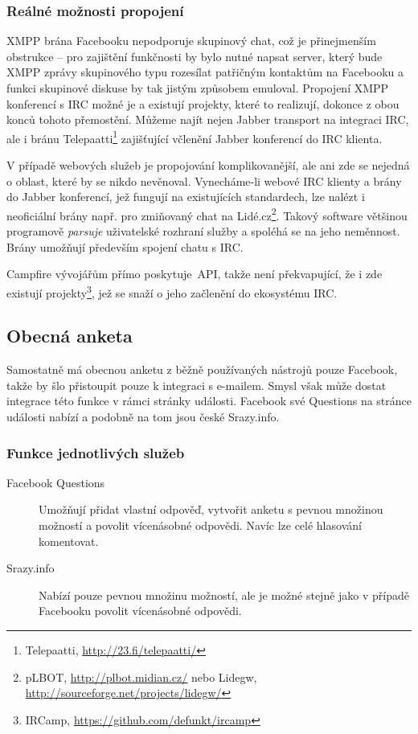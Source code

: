 \documentclass[12pt,oneside,final]{fithesis2}
\begin{document}
\subsubsection*{Reálné možnosti propojení}
XMPP brána Facebooku nepodporuje skupinový chat, což je přinejmenším obstrukce -- pro zajištění funkčnosti by bylo nutné napsat server, který bude XMPP zprávy skupinového typu rozesílat patřičným kontaktům na Facebooku a funkci skupinové diskuse by tak jistým způsobem emuloval. Propojení XMPP konferencí s IRC možné je a existují projekty, které to realizují, dokonce z obou konců tohoto přemostění. Můžeme najít nejen Jabber transport na integraci IRC, ale i bránu Telepaatti\footnote{Telepaatti, \url{http://23.fi/telepaatti/}} zajišťující včlenění Jabber konferencí do IRC klienta.

V případě webových služeb je propojování komplikovanější, ale ani zde se nejedná o oblast, které by se nikdo nevěnoval. Vynecháme-li webové IRC klienty a brány do Jabber konferencí, jež fungují na existujících standardech, lze nalézt i neoficiální brány např. pro zmiňovaný chat na Lidé.cz\footnote{pLBOT, \url{http://plbot.midian.cz/} nebo Lidegw, \url{http://sourceforge.net/projects/lidegw/}}. Takový software většinou programově \emph{parsuje} uživatelské rozhraní služby a spoléhá se na jeho neměnnost. Brány umožňují především spojení chatu s IRC.

Campfire vývojářům přímo poskytuje~API, takže není překvapující, že i zde existují projekty\footnote{IRCamp, \url{https://github.com/defunkt/ircamp}}, jež se snaží o jeho začlenění do ekosystému IRC.

\subsection{Obecná anketa}\label{genericPoll}
Samostatně má obecnou anketu z běžně používaných nástrojů pouze Facebook, takže by šlo přistoupit pouze k integraci s e-mailem. Smysl však může dostat integrace této funkce v rámci stránky události. Facebook své Questions na stránce události nabízí a podobně na tom jsou české Srazy.info.

\subsubsection*{Funkce jednotlivých služeb}
\begin{description}
    \item[Facebook Questions]
        Umožňují přidat vlastní odpověď, vytvořit anketu s pevnou množinou možností a povolit vícenásobné odpovědi. Navíc lze celé hlasování komentovat.

    \item[Srazy.info]
        Nabízí pouze pevnou množinu možností, ale je možné stejně jako v případě Facebooku povolit vícenásobné odpovědi.
\end{description}
\end{document}
